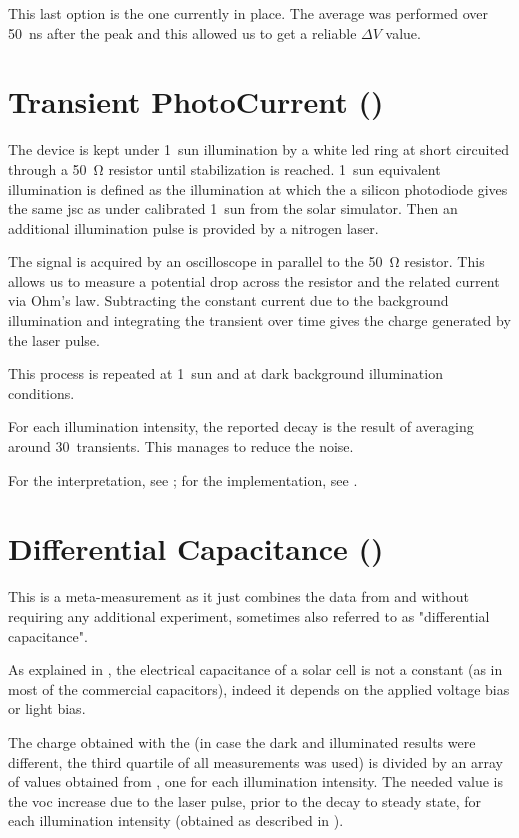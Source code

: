 This last option is the one currently in place. The average was performed over \SI{50}{ns} after the peak and this allowed us to get a reliable $\Delta V$ value.

\section{Transient PhotoCurrent ()}

The device is kept under 1~sun illumination by a white \gls{led} ring at short circuited through a \SI{50}{\ohm} resistor until stabilization is reached. 1~sun equivalent illumination is defined as the illumination at which the a silicon photodiode gives the same \gls{jsc} as under calibrated 1~sun from the solar simulator. Then an additional illumination pulse is provided by a nitrogen laser.

The signal is acquired by an oscilloscope in parallel to the \SI{50}{\ohm} resistor. This allows us to measure a potential drop across the resistor and the related current via Ohm's law. Subtracting the constant current due to the background illumination and integrating the transient over time gives the charge generated by the laser pulse.

This process is repeated at 1~sun and at dark background illumination conditions.

For each illumination intensity, the reported decay is the result of averaging around 30~transients. This manages to reduce the noise.

For the interpretation, see ; for the implementation, see .

\section{Differential Capacitance ()}

This is a meta-measurement as it just combines the data from  and  without requiring any additional experiment\cite{Shuttle2008}, sometimes also referred to as "differential capacitance".

As explained in , the electrical capacitance of a solar cell is not a constant (as in most of the commercial capacitors), indeed it depends on the applied voltage bias or light bias.

The charge obtained with the  (in case the dark and illuminated results were different, the third quartile of all  measurements was used) is divided by an array of values obtained from , one for each illumination intensity. The needed value is the \gls{voc} increase due to the laser pulse, prior to the decay to steady state, for each illumination intensity (obtained as described in ).

